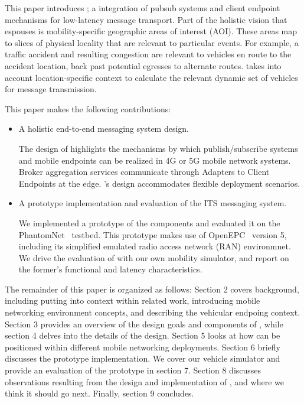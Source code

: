 This paper introduces \name; a integration of pubsub systems and
client endpoint mechanisms for low-latency message transport.  Part of
the holistic vision that \name espouses is mobility-specific
geographic areas of interest (AOI). These areas map to slices of
physical locality that are relevant to particular events.  For
example, a traffic accident and resulting congestion are relevant to
vehicles en route to the accident location, back past potential
egresses to alternate routes.  \name takes into account
location-specific context to calculate the relevant dynamic set of
vehicles for message transmission.

This paper makes the following contributions:
\begin{itemize}

\item A holistic end-to-end messaging system design.

The design of \name highlights the mechanisms by which
publish/subscribe systems and mobile endpoints can be realized in 4G
or 5G mobile network systems. Broker aggregation services communicate
through Adapters to Client Endpoints at the edge. \name's design
accommodates flexible deployment scenarios.

\item A prototype implementation and evaluation of the \name ITS
  messaging system.

We implemented a prototype of the \name components and evaluated it
on the PhantomNet~\cite{banerjee2015phantomnet} testbed.  This
prototype makes use of OpenEPC~\cite{corici2010openepc} version 5,
including its simplified emulated radio access network (RAN)
environmnet. We drive the evaluation of \name with our own mobility
simulator, and report on the former's functional and latency
characteristics.

\end{itemize}

The remainder of this paper is organized as follows: Section 2 covers
background, including putting \name into context within related
work, introducing mobile networking environment concepts, and
describing the vehicular endpoing context. Section 3 provides an
overview of the design goals and components of \name, while section
4 delves into the details of the design. Section 5 looks at how
\name can be positioned within different mobile networking
deployments.  Section 6 briefly discusses the \name prototype
implementation. We cover our vehicle simulator and provide an
evaluation of the prototype in section 7. Section 8 discusses
observations resulting from the design and implementation of \name,
and where we think it should go next.  Finally, section 9 concludes.
